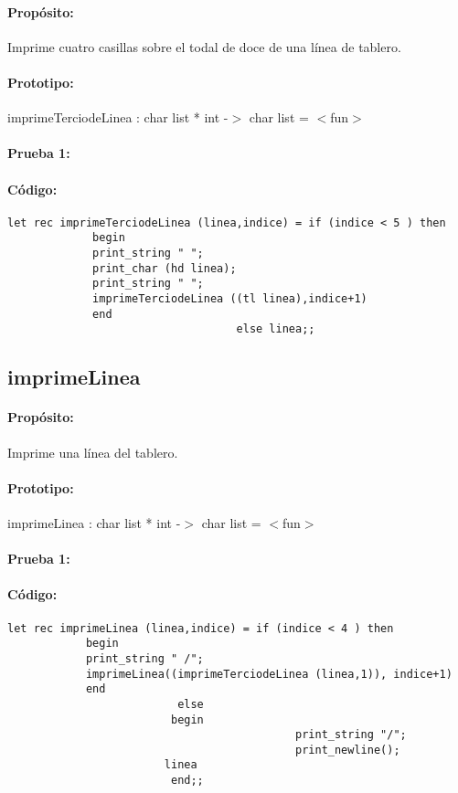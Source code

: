 \paragraph{Propósito:} Imprime cuatro casillas sobre el todal de doce de una línea de
tablero.
\paragraph{Prototipo:} imprimeTerciodeLinea : char list * int -$>$ char list = $<$fun$>$
\paragraph{Prueba 1:}
\paragraph{Código:}
\begin{verbatim}
let rec imprimeTerciodeLinea (linea,indice) = if (indice < 5 ) then 
			 begin
			 print_string " ";  
			 print_char (hd linea);
			 print_string " "; 	                 
			 imprimeTerciodeLinea ((tl linea),indice+1)
			 end
			                       else linea;;
\end{verbatim}

\subsection{imprimeLinea}

\paragraph{Propósito:} Imprime una línea del tablero.
\paragraph{Prototipo:} imprimeLinea : char list * int -$>$ char list = $<$fun$>$
\paragraph{Prueba 1:}
\paragraph{Código:}
\begin{verbatim}
let rec imprimeLinea (linea,indice) = if (indice < 4 ) then 
			begin
			print_string " /";
			imprimeLinea((imprimeTerciodeLinea (linea,1)), indice+1)
			end 
			              else 
				         begin
                                            print_string "/";
                                            print_newline();
					    linea
				         end;;
\end{verbatim}

